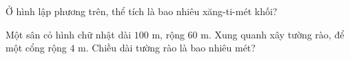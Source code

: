 \begin{ex}
  Ở hình lập phương trên, thể tích là bao nhiêu xăng-ti-mét khối?
\end{ex}

\begin{ex}
  Một sân cỏ hình chữ nhật dài $100\text{ m}$, rộng $60\text{ m}$. Xung quanh xây tường rào, để một cổng rộng $4\text{ m}$. Chiều dài tường rào là bao nhiêu mét?
\end{ex}
